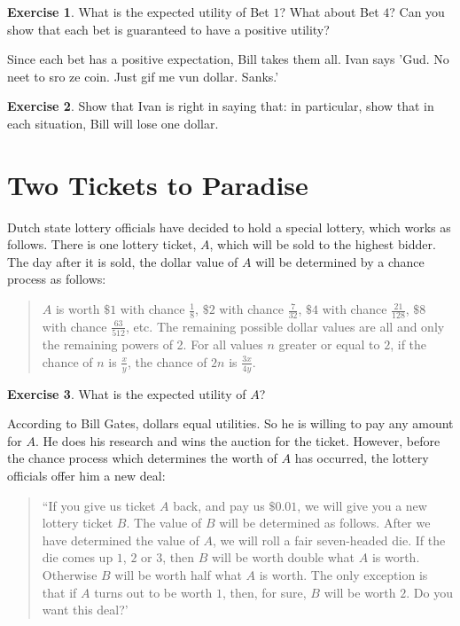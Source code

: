\documentclass[11pt]{article}
\theoremstyle{definition}
\newtheorem{exer}{Exercise}
\begin{document}
\begin{exer}
What is the expected utility of Bet $1$? What about Bet $4$? Can you show that each bet is guaranteed to have a positive utility?
\end{exer}


Since each bet has a positive expectation, Bill takes them all. Ivan says 'Gud. No neet to sro ze coin. Just gif me vun dollar. Sanks.' 

\begin{exer}
Show that Ivan is right in saying that: in particular, show that in each situation, Bill will lose one dollar. 
\end{exer}

\section{Two Tickets to Paradise}

Dutch state lottery officials have decided to hold a special lottery, which works as follows. There is one lottery ticket, $A$, which will be sold to the highest bidder. The day after it is sold, the dollar value of $A$ will be determined by a chance process as follows:

\begin{quote}
$A$ is worth $\$ 1$ with chance $\frac{1}{8}$, $\$ 2$ with chance $\frac{7}{32}$, $\$ 4$ with chance $\frac{21}{128}$, $\$ 8$ with chance $\frac{63}{512}$, etc. The remaining possible dollar values are all and only the remaining powers of 2. For all values $n$ greater or equal to $2$, if the chance of $n$ is $\frac{x}{y}$, the chance of $2n$ is $\frac{3x}{4y}$.
\end{quote}

\begin{exer}
What is the expected utility of $A$?
\end{exer}

According to Bill Gates, dollars equal utilities. So he is willing to pay any amount for $A$. He does his research and wins the auction for the ticket. However, before the chance process which determines the worth of $A$ has occurred, the lottery officials offer him a new deal:

\begin{quote}
``If you give us ticket $A$ back, and pay us $\$ 0.01$, we will give you a new lottery ticket $B$. The value of $B$ will be determined as follows. After we have determined the value of $A$, we will roll a fair seven-headed die. If the die comes up $1$, $2$ or $3$, then $B$ will be worth double what $A$ is worth. Otherwise $B$ will be worth half what $A$ is worth. The only exception is that if $A$ turns out to be worth $1$, then, for sure, $B$ will be worth $2$. Do you want this deal?'
\end{quote}
\end{document}
